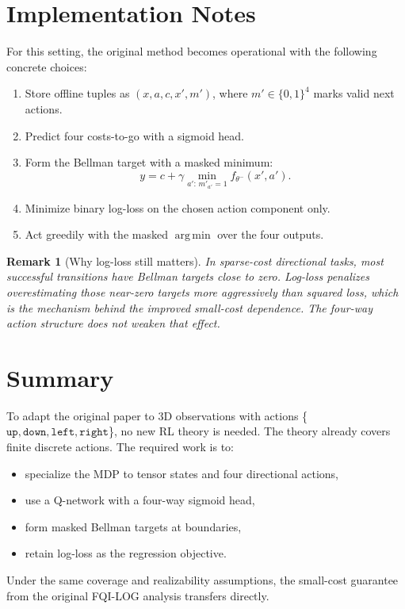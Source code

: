 \documentclass[11pt]{article}
\newtheorem{remark}{Remark}
\newcommand{\argmin}{\mathop{\mathrm{arg\,min}}}
\newcommand{\up}{\texttt{up}}
\newcommand{\downa}{\texttt{down}}
\newcommand{\lefta}{\texttt{left}}
\newcommand{\righta}{\texttt{right}}
\begin{document}
\section{Implementation Notes}
For this setting, the original method becomes operational with the following concrete choices:
\begin{enumerate}[leftmargin=*]
  \item Store offline tuples as $(x, a, c, x', m')$, where $m' \in \{0,1\}^4$ marks valid next actions.
  \item Predict four costs-to-go with a sigmoid head.
  \item Form the Bellman target with a masked minimum:
  \[
  y = c + \gamma \min_{a':\, m'_{a'} = 1} f_{\theta^-}(x', a').
  \]
  \item Minimize binary log-loss on the chosen action component only.
  \item Act greedily with the masked $\argmin$ over the four outputs.
\end{enumerate}

\begin{remark}[Why log-loss still matters]
In sparse-cost directional tasks, most successful transitions have Bellman targets close to zero. Log-loss penalizes overestimating those near-zero targets more aggressively than squared loss, which is the mechanism behind the improved small-cost dependence. The four-way action structure does not weaken that effect.
\end{remark}

\section{Summary}
To adapt the original paper to 3D observations with actions \{$\up,\downa,\lefta,\righta$\}, no new RL theory is needed. The theory already covers finite discrete actions. The required work is to:
\begin{itemize}[leftmargin=*]
  \item specialize the MDP to tensor states and four directional actions,
  \item use a Q-network with a four-way sigmoid head,
  \item form masked Bellman targets at boundaries,
  \item retain log-loss as the regression objective.
\end{itemize}
Under the same coverage and realizability assumptions, the small-cost guarantee from the original FQI-LOG analysis transfers directly.
\end{document}
